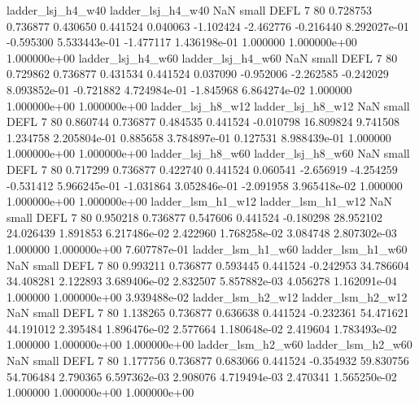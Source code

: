        ladder_lsj_h4_w40        ladder_lsj_h4_w40                   NaN      small     DEFL                 7 80 0.728753       0.736877 0.430650       0.441524    0.040063     -1.102424     -2.462776    -0.216440   8.292027e-01 -0.595300 5.533443e-01    -1.477117   1.436198e-01            1.000000    1.000000e+00        1.000000e+00
       ladder_lsj_h4_w60        ladder_lsj_h4_w60                   NaN      small     DEFL                 7 80 0.729862       0.736877 0.431534       0.441524    0.037090     -0.952006     -2.262585    -0.242029   8.093852e-01 -0.721882 4.724984e-01    -1.845968   6.864274e-02            1.000000    1.000000e+00        1.000000e+00
       ladder_lsj_h8_w12        ladder_lsj_h8_w12                   NaN      small     DEFL                 7 80 0.860744       0.736877 0.484535       0.441524   -0.010798     16.809824      9.741508     1.234758   2.205804e-01  0.885658 3.784897e-01     0.127531   8.988439e-01            1.000000    1.000000e+00        1.000000e+00
       ladder_lsj_h8_w60        ladder_lsj_h8_w60                   NaN      small     DEFL                 7 80 0.717299       0.736877 0.422740       0.441524    0.060541     -2.656919     -4.254259    -0.531412   5.966245e-01 -1.031864 3.052846e-01    -2.091958   3.965418e-02            1.000000    1.000000e+00        1.000000e+00
       ladder_lsm_h1_w12        ladder_lsm_h1_w12                   NaN      small     DEFL                 7 80 0.950218       0.736877 0.547606       0.441524   -0.180298     28.952102     24.026439     1.891853   6.217486e-02  2.422960 1.768258e-02     3.084748   2.807302e-03            1.000000    1.000000e+00        7.607787e-01
       ladder_lsm_h1_w60        ladder_lsm_h1_w60                   NaN      small     DEFL                 7 80 0.993211       0.736877 0.593445       0.441524   -0.242953     34.786604     34.408281     2.122893   3.689406e-02  2.832507 5.857882e-03     4.056278   1.162091e-04            1.000000    1.000000e+00        3.939488e-02
       ladder_lsm_h2_w12        ladder_lsm_h2_w12                   NaN      small     DEFL                 7 80 1.138265       0.736877 0.636638       0.441524   -0.232361     54.471621     44.191012     2.395484   1.896476e-02  2.577664 1.180648e-02     2.419604   1.783493e-02            1.000000    1.000000e+00        1.000000e+00
       ladder_lsm_h2_w60        ladder_lsm_h2_w60                   NaN      small     DEFL                 7 80 1.177756       0.736877 0.683066       0.441524   -0.354932     59.830756     54.706484     2.790365   6.597362e-03  2.908076 4.719494e-03     2.470341   1.565250e-02            1.000000    1.000000e+00        1.000000e+00
